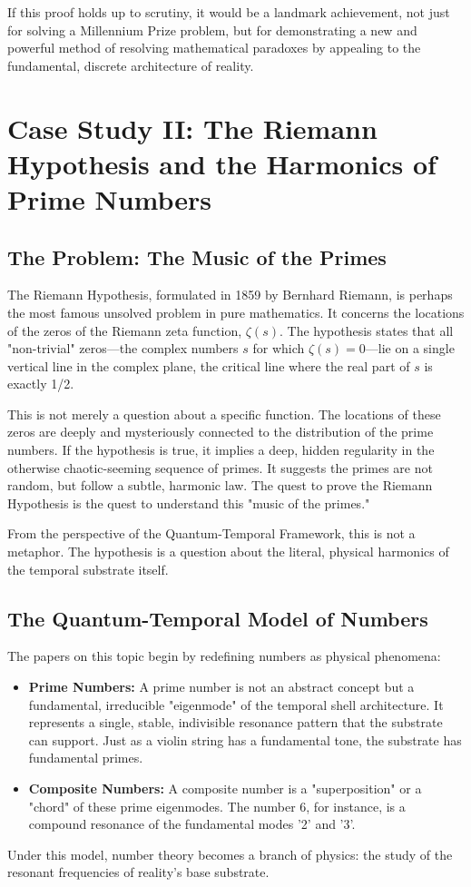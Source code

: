 \documentclass[12pt]{report}
\begin{document}
If this proof holds up to scrutiny, it would be a landmark achievement, not just for solving a Millennium Prize problem, but for demonstrating a new and powerful method of resolving mathematical paradoxes by appealing to the fundamental, discrete architecture of reality.

\chapter{Case Study II: The Riemann Hypothesis and the Harmonics of Prime Numbers}

\section{The Problem: The Music of the Primes}
The Riemann Hypothesis, formulated in 1859 by Bernhard Riemann, is perhaps the most famous unsolved problem in pure mathematics. It concerns the locations of the zeros of the Riemann zeta function, $\zeta(s)$. The hypothesis states that all "non-trivial" zeros—the complex numbers $s$ for which $\zeta(s) = 0$—lie on a single vertical line in the complex plane, the critical line where the real part of $s$ is exactly 1/2.

This is not merely a question about a specific function. The locations of these zeros are deeply and mysteriously connected to the distribution of the prime numbers. If the hypothesis is true, it implies a deep, hidden regularity in the otherwise chaotic-seeming sequence of primes. It suggests the primes are not random, but follow a subtle, harmonic law. The quest to prove the Riemann Hypothesis is the quest to understand this "music of the primes."

From the perspective of the Quantum-Temporal Framework, this is not a metaphor. The hypothesis is a question about the literal, physical harmonics of the temporal substrate itself.

\section{The Quantum-Temporal Model of Numbers}
The papers on this topic begin by redefining numbers as physical phenomena:
\begin{itemize}
    \item \textbf{Prime Numbers:} A prime number is not an abstract concept but a fundamental, irreducible "eigenmode" of the temporal shell architecture. It represents a single, stable, indivisible resonance pattern that the substrate can support. Just as a violin string has a fundamental tone, the substrate has fundamental primes.
    \item \textbf{Composite Numbers:} A composite number is a "superposition" or a "chord" of these prime eigenmodes. The number 6, for instance, is a compound resonance of the fundamental modes '2' and '3'.
\end{itemize}
Under this model, number theory becomes a branch of physics: the study of the resonant frequencies of reality's base substrate.
\end{document}
